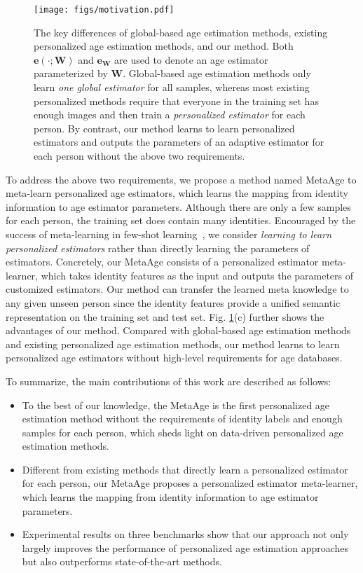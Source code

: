 \documentclass[journal,twoside]{IEEEtran}
\begin{document}
\begin{figure}[t]
  \centering
  \texttt{[image: figs/motivation.pdf]}
  \caption{The key differences of global-based age estimation methods, existing personalized age estimation methods, and our method. Both $\bm{e(\cdot ; W)}$ and $\bm{e_{W}}$ are used to denote an age estimator parameterized by $\bm{W}$. Global-based age estimation methods only learn \emph{one global estimator} for all samples, whereas most existing personalized methods require that everyone in the training set has enough images and then train a \emph{personalized estimator} for each person. By contrast, our method learns to learn personalized estimators and outputs the parameters of an adaptive estimator for each person without the above two requirements.}
  \label{fig:introduction}
\end{figure}


To address the above two requirements, we propose a method named MetaAge to meta-learn personalized age estimators, which learns the mapping from identity information to age estimator parameters.
Although there are only a few samples for each person, the training set does contain many identities. Encouraged by the success of meta-learning in few-shot learning~\cite{finn2017model}, we consider \emph{learning to learn personalized estimators} rather than directly learning the parameters of estimators. Concretely, our MetaAge consists of a personalized estimator meta-learner, which takes identity features as the input and outputs the parameters of customized estimators. Our method can transfer the learned meta knowledge to any given unseen person since the identity features provide a unified semantic representation on the training set and test set. 
Fig. \ref{fig:introduction}(c) further shows the advantages of our method.  Compared with global-based age estimation methods and existing personalized age estimation methods,  our method learns to learn personalized age estimators without high-level requirements for age databases.


To summarize, the main contributions of this work are described as follows:

\begin{itemize}
\item
  To the best of our knowledge, the MetaAge is the first personalized age estimation method without the requirements of identity labels and enough samples for each person, which sheds light on data-driven personalized age estimation methods.
\item
  Different from existing methods that directly learn a personalized estimator for each person, our MetaAge proposes a personalized estimator meta-learner, which learns the mapping from identity information to age estimator parameters.
\item
  Experimental results on three benchmarks show that our approach not only largely improves the performance of personalized age estimation approaches but also outperforms state-of-the-art methods.

\end{itemize}
\end{document}
